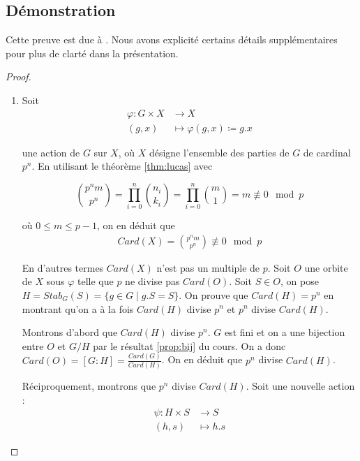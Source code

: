 \documentclass{article}
\theoremstyle{definition}
\theoremstyle{plain}
\theoremstyle{plain}
\theoremstyle{plain}
\theoremstyle{plain}
\theoremstyle{definition}
\theoremstyle{plain}
\theoremstyle{plain}
\begin{document}
\subsection{Démonstration}

Cette preuve est due à \cite[p.~216-218]{chen2024napkin}. Nous avons explicité certains détails supplémentaires pour plus de clarté dans la présentation.
\begin{proof}
	\begin{enumerate}[label={\upshape(\roman*)}]
	\item Soit
\begin{align*}
	\varphi : G \times X &\to X \\
	(g,x) &\mapsto \varphi(g,x) \coloneq g.x
\end{align*}

une action de \( G \) sur \( X \), où \( X \) désigne l'ensemble des parties de \( G \) de cardinal \( p^{n} \). En utilisant le théorème \ref{thm:lucas} avec 

\begin{equation*}
	\binom{p^{n}m}{p^{n}} = \prod_{i=0}^{n} \binom{n_i}{k_i} = \prod_{i=0}^{n} \binom{m}{1} = m \not\equiv 0 \mod p
\end{equation*}

où \( 0 \leq m \leq p-1 \), on en déduit que 
\begin{align*}
	Card(X) = \binom{p^{n}m}{p^{n}} \not\equiv 0 \mod p 
\end{align*}

En d'autres termes \( Card(X) \) n'est pas un multiple de \( p \).
Soit \( O \) une orbite de \( X \) sous \( \varphi \) telle que \( p \) ne divise pas \( Card(O) \). Soit \( S \in O \), on pose \( H = Stab_{G}({S}) = \{ g \in G \mid g.S = S \} \).
On prouve que \( Card(H) = p^{n} \) en montrant qu'on a à la fois \( Card(H) \) divise \( p^{n} \) et \( p^{n} \) divise \(Card(H) \).

\par Montrons d'abord que \( Card(H) \) divise \( p^{n} \). \( G \) est fini et on a une bijection entre \( O \) et \( G/H \) par le résultat \ref{prop:bij} du cours. On a donc \( Card(O) = [G : H]  = \frac{Card(G)}{Card(H)} \). On en déduit que \( p^{n} \) divise \( Card(H) \).

\par Réciproquement, montrons que \( p^{n} \) divise \(Card(H)\). Soit une nouvelle action :
\begin{align*}
	\psi : H \times S &\to S \\
	(h,s) &\mapsto h.s
\end{align*}


\end{enumerate}
\end{proof}
\end{document}
